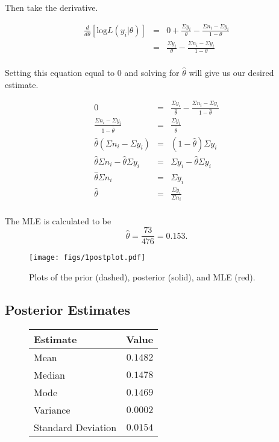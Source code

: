 \documentclass[12pt]{article}
\begin{document}
\noindent Then take the derivative.  

\begin{eqnarray*}
\frac{d}{d\theta}\left[\mathrm{log}L(y_i|\theta)\right] &=& 0 + \frac{\Sigma y_i}{\theta} - \frac{\Sigma n_i-\Sigma y_i}{1-\theta} \\
&=& \frac{\Sigma y_i}{\theta} - \frac{\Sigma n_i-\Sigma y_i}{1-\theta} \\
\end{eqnarray*}

\noindent Setting this equation equal to 0 and solving for $\hat{\theta}$ will give us our desired estimate.

\begin{eqnarray*}
0 &=& \frac{\Sigma y_i}{\hat{\theta}} - \frac{\Sigma n_i-\Sigma y_i}{1-\hat{\theta}}\\
\frac{\Sigma n_i-\Sigma y_i}{1-\hat{\theta}} &=& \frac{\Sigma y_i}{\hat{\theta}} \\
\hat{\theta}(\Sigma n_i-\Sigma y_i) &=& (1-\hat{\theta})\Sigma y_i \\
\hat{\theta}\Sigma n_i - \hat{\theta}\Sigma y_i &=& \Sigma y_i -\hat{\theta}\Sigma y_i \\
\hat{\theta}\Sigma n_i &=& \Sigma y_i \\
\hat{\theta} &=& \frac{\Sigma y_i}{\Sigma n_i} \\
\end{eqnarray*}

\noindent The MLE is calculated to be
\[\hat{\theta}=\frac{73}{476}=0.153.\]

\begin{figure}[H]
\begin{center}
\texttt{[image: figs/1postplot.pdf]}
\caption{Plots of the prior (dashed), posterior (solid), and MLE (red).}
\end{center}
\end{figure}


\subsection{Posterior Estimates}

\begin{figure}[H]
\begin{center}
\begin{tabular}{l|r}
Estimate & \multicolumn{1}{l}{Value} \\ \hline \hline
Mean               & $0.1482$ \\
Median             & $0.1478$ \\
Mode               & $0.1469$ \\
Variance           & $0.0002$ \\
Standard Deviation & $0.0154$ \\
\end{tabular}
\end{center}
\end{figure}
\end{document}
